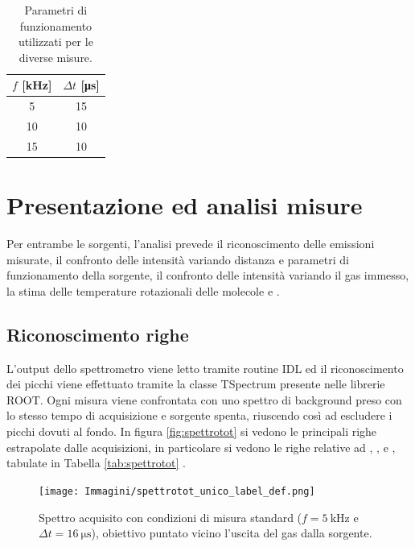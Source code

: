 \begin{table}
 \centering
 \begin{tabular}{cc}
 \toprule
 $f$ [\si{\kilo\hertz}]  &$\Delta t$ [\si{\micro\second}]\\
 \midrule
 5  &15\\
 10 &10\\
 15 &10\\
 \bottomrule
 \end{tabular}
 \caption{Parametri di funzionamento utilizzati per le diverse misure.}
 \label{tab:setsorgente}
\end{table}



\section{Presentazione ed analisi misure}
Per entrambe le sorgenti, l'analisi prevede il riconoscimento delle emissioni misurate, il confronto delle intensità variando distanza e parametri di funzionamento della sorgente, il confronto delle intensità variando il gas immesso, la stima delle temperature rotazionali delle molecole  e .

\subsection{Riconoscimento righe}
L'output dello spettrometro viene letto tramite routine IDL ed il riconoscimento dei picchi viene effettuato tramite la classe TSpectrum presente nelle librerie ROOT. Ogni misura viene confrontata con uno spettro di background preso con lo stesso tempo di acquisizione e sorgente spenta, riuscendo così ad escludere i picchi dovuti al fondo.
In figura \ref{fig:spettrotot} si vedono le principali righe estrapolate dalle acquisizioni, in particolare si vedono le righe relative ad , ,  e , tabulate in Tabella \ref{tab:spettrotot} .

\begin{figure}
\centering
\texttt{[image: Immagini/spettrotot\_unico\_label\_def.png]}
\caption{Spettro acquisito con condizioni di misura standard ($f = \SI{5}{\kilo\hertz}$ e $\Delta t = \SI{16}{\micro\second}$), obiettivo puntato vicino l'uscita del gas dalla sorgente.}
\label{fig:app}
\end{figure}

